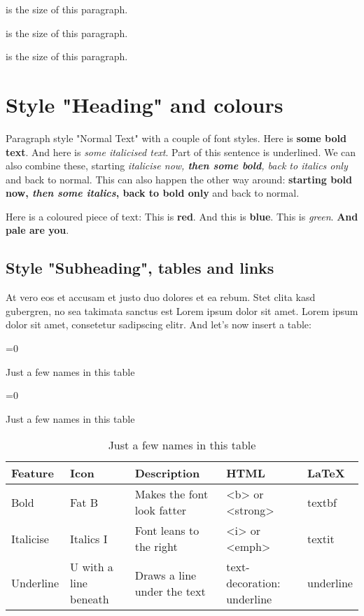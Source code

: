 {\FontSizeTwentysixPT 26pt is the size of this paragraph.}

{\FontSizeTwentyeightPT 28pt is the size of this paragraph.}

{\FontSizeThirtyPT 30pt is the size of this paragraph.}

\chapter{Style "Heading" and colours}

Paragraph style "Normal Text" with a couple of font
styles. Here is 
\textbf{some bold text}. And here is 
\textit{some italicised text}. 
Part of this sentence is underlined. 
We can also combine these, starting 
\textit{italicise now, \textbf{then some bold}, back to italics only} and back to normal. This can
also happen the other way around: 
\textbf{starting bold now, \textit{then some italics}, back to bold only} and
back to normal.

Here is a coloured piece of text: 
\textcolor[rgb]{1,0,0}{This is \textbf{red}.}
\textcolor[rgb]{0,0,1}{And this is \textbf{blue}.}
\textcolor[rgb]{0,1,0}{This is \textit{green}.}
\textcolor[rgb]{0.5,0.5,0.5}{\textbf{And pale are you}.}

\lipsum[3]

\section{Style "Subheading", tables and links}
At vero eos et accusam et justo duo dolores et ea rebum. Stet
clita kasd gubergren, no sea takimata sanctus est Lorem ipsum dolor
sit amet. Lorem ipsum dolor sit amet, consetetur sadipscing elitr.
And let's now insert a table:

\noindent
\begin{table}[H]
	\ifnum{}=0 
		\caption*{Just a few names in this table}
	\else
		\ifnum{}=0 
			\caption*{Just a few names in this table}
		\else
			\caption{Just a few names in this table} 
		\fi
	\fi
	\begin{center}
		\begin{tabular}{lllll}
			\toprule
			Feature & Icon & Description & HTML & LaTeX \\
			\midrule
			Bold & Fat B & Makes the font look fatter & <b> or <strong> & textbf \\
			Italicise & Italics I & Font leans to the right & <i> or <emph> & textit \\
			Underline & U with a line beneath & Draws a line under the text & text-decoration: underline & underline \\
			\bottomrule
		\end{tabular}
	\end{center}
\end{table}
		
